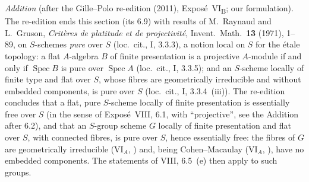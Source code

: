 \par\medskip\noindent
\emph{Addition} (after the Gille--Polo re-edition (2011), Expos\'e~VI\textsubscript{B}; our formulation).
The re-edition ends this section (its 6.9) with results of M.~Raynaud and L.~Gruson, \emph{Crit\`eres de platitude
et de projectivit\'e}, Invent.\ Math.\ \textbf{13} (1971), 1--89, on \(S\)-schemes \emph{pure} over \(S\)
(loc.\ cit., I, 3.3.3), a notion local on \(S\) for the \'etale topology: a flat \(A\)-algebra \(B\) of finite
presentation is a projective \(A\)-module if and only if \(\operatorname{Spec}B\) is pure over
\(\operatorname{Spec}A\) (loc.\ cit., I, 3.3.5); and an \(S\)-scheme locally of finite type and flat over \(S\),
whose fibres are geometrically irreducible and without embedded components, is pure over \(S\)
(loc.\ cit., I, 3.3.4~(iii)). The re-edition concludes that a flat, pure \(S\)-scheme locally of finite
presentation is essentially free over \(S\) (in the sense of Expos\'e~VIII, 6.1, with ``projective'', see the
Addition after 6.2), and that an \(S\)-group scheme \(G\) locally of finite presentation and flat over \(S\), with
connected fibres, is pure over \(S\), hence essentially free: the fibres of \(G\) are geometrically irreducible
(VI\(_A\), ) and, being Cohen--Macaulay
(VI\(_A\), ), have no embedded components. The statements of VIII, 6.5~(e)
then apply to such groups.
\par\medskip

